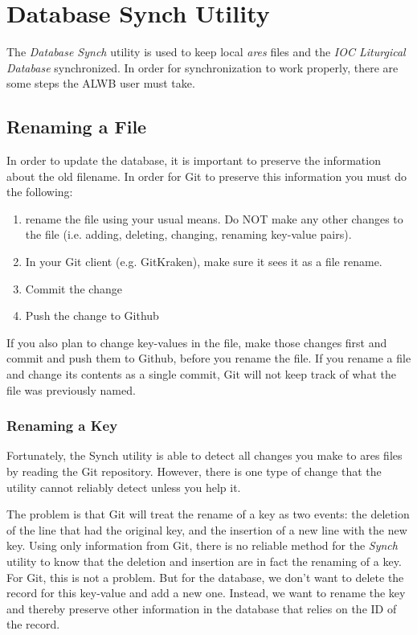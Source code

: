 \documentclass[]{memoir}
\begin{document}
\section{Database Synch Utility}

The \emph{Database Synch} utility is used to keep local \emph{ares} files and the \emph{IOC Liturgical Database} synchronized.  In order for synchronization to work properly, there are some steps the ALWB user must take.

\subsection{Renaming a File}
In order to update the database, it is important to preserve the information about the old filename. In order for Git to preserve this information you must do the following:

\begin{enumerate}
    \item rename the file using your usual means.  Do NOT make any other changes to the file (i.e. adding, deleting, changing, renaming key-value pairs).
    \item In your Git client (e.g. GitKraken), make sure it sees it as a file rename. 
    \item Commit the change
    \item Push the change to Github
\end{enumerate}

\begin{warning}
If you also plan to change key-values in the file, make those changes first and commit and push them to Github, before you rename the file. If you rename a file and change its contents as a single commit, Git will not keep track of what the file was previously named.  
\end{warning}

\subsubsection{Renaming a Key}

Fortunately, the Synch utility is able to detect all changes you make to ares files by reading the Git repository.  However, there is one type of change that the utility cannot reliably detect unless you help it.  

The problem is that Git will treat the rename of a key as two events: the deletion of the line that had the original key, and the insertion of a new line with the new key.  Using only information from Git, there is no reliable method for the \emph{Synch} utility to know that the deletion and insertion are in fact the renaming of a key.  For Git, this is not a problem.  But for the database, we don't want to delete the record for this key-value and add a new one.  Instead, we want to rename the key and thereby preserve other information in the database that relies on the ID of the record.
\end{document}
